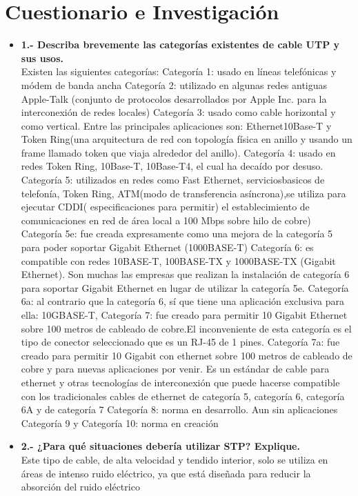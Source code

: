 \documentclass{udpreport}
\begin{document}
	\section{Cuestionario e Investigación}
		\begin{itemize}
		\item{\bf 1.- Describa brevemente las categorías existentes de cable UTP y sus usos.} 
\\Existen las siguientes categorías:
Categoría 1: usado en líneas telefónicas y módem de banda ancha 
Categoría 2: utilizado  en algunas redes antiguas Apple-Talk (conjunto de protocolos desarrollados por Apple Inc. para la interconexión de redes locales)
Categoría 3: usado como cable horizontal y como vertical. Entre las principales aplicaciones son:  Ethernet10Base-T y Token Ring(una arquitectura de red con topología física en anillo y usando un frame llamado token que viaja alrededor del anillo).
Categoría 4: usado en redes Token Ring, 10Base-T, 10Base-T4, el cual ha decaído por desuso.
Categoría 5: utilizados en redes como Fast Ethernet, serviciosbasicos de telefonía, Token Ring, ATM(modo de transferencia asíncrona),se utiliza para ejecutar CDDI( especificaciones para permitir) el establecimiento de comunicaciones en red de área local a 100 Mbps sobre hilo de cobre)
Categoría 5e: fue creada expresamente como una mejora de la categoría 5 para poder soportar Gigabit Ethernet (1000BASE-T) 
Categoría 6: es compatible con redes 10BASE-T, 100BASE-TX y 1000BASE-TX (Gigabit Ethernet). Son muchas las empresas que realizan la instalación de categoría 6 para soportar Gigabit Ethernet en lugar de utilizar la categoría 5e.
Categoría 6a: al contrario que la categoría 6, sí que tiene una aplicación exclusiva para ella: 10GBASE-T, 
Categoría 7:  fue creado para permitir 10 Gigabit Ethernet sobre 100 metros de cableado de cobre.El inconveniente de esta categoría es el tipo de conector seleccionado que es un RJ-45 de 1 pines. 
Categoría 7a: fue creado para permitir 10 Gigabit con ethernet sobre 100 metros de cableado de cobre y para nuevas aplicaciones por venir.  Es un estándar de cable para ethernet y otras tecnologías de interconexión que puede hacerse compatible con los tradicionales cables de ethernet de categoría 5, categoría 6, categoría 6A y de categoría 7
Categoría 8: norma en desarrollo. Aun sin aplicaciones
Categoría 9 y Categoría 10: norma en creación
        \item{\bf 2.- ¿Para qué situaciones debería utilizar STP? Explique.}
 \\Este tipo de cable, de alta velocidad y tendido interior, solo se utiliza en áreas de intenso ruido eléctrico, ya que está diseñada para reducir la absorción del ruido eléctrico
\end{itemize}
\end{document}
